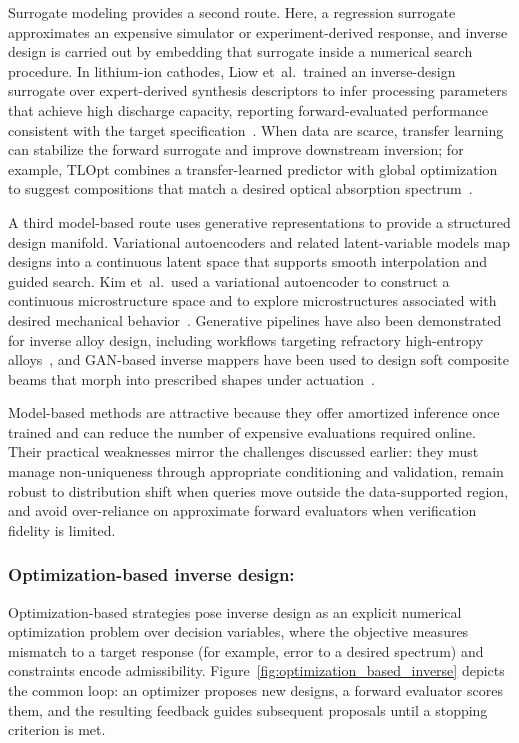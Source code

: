 Surrogate modeling provides a second route. Here, a regression surrogate approximates an expensive simulator or experiment-derived response, and inverse design is carried out by embedding that surrogate inside a numerical search procedure. In lithium-ion cathodes, Liow et~al.\ trained an inverse-design surrogate over expert-derived synthesis descriptors to infer processing parameters that achieve high discharge capacity, reporting forward-evaluated performance consistent with the target specification~\cite{Liow2022_NanoEnergy}. When data are scarce, transfer learning can stabilize the forward surrogate and improve downstream inversion; for example, TLOpt combines a transfer-learned predictor with global optimization to suggest compositions that match a desired optical absorption spectrum~\cite{Dong2021_CMS}.

A third model-based route uses generative representations to provide a structured design manifold. Variational autoencoders and related latent-variable models map designs into a continuous latent space that supports smooth interpolation and guided search. Kim et~al.\ used a variational autoencoder to construct a continuous microstructure space and to explore microstructures associated with desired mechanical behavior~\cite{Kim2021_MatDes}. Generative pipelines have also been demonstrated for inverse alloy design, including workflows targeting refractory high-entropy alloys~\cite{Debnath2021JMI}, and GAN-based inverse mappers have been used to design soft composite beams that morph into prescribed shapes under actuation~\cite{Brzin2024_EAAI}.

Model-based methods are attractive because they offer amortized inference once trained and can reduce the number of expensive evaluations required online. Their practical weaknesses mirror the challenges discussed earlier: they must manage non-uniqueness through appropriate conditioning and validation, remain robust to distribution shift when queries move outside the data-supported region, and avoid over-reliance on approximate forward evaluators when verification fidelity is limited.



\subsubsection{Optimization-based inverse design:}

Optimization-based strategies pose inverse design as an explicit numerical optimization problem over decision variables, where the objective measures mismatch to a target response (for example, error to a desired spectrum) and constraints encode admissibility. Figure~\ref{fig:optimization_based_inverse} depicts the common loop: an optimizer proposes new designs, a forward evaluator scores them, and the resulting feedback guides subsequent proposals until a stopping criterion is met.

